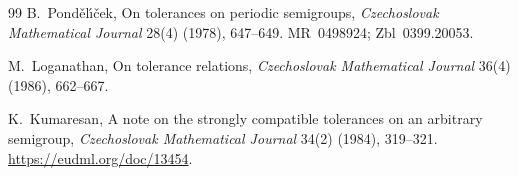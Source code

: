 \documentclass[10pt,a4paper]{article}
\theoremstyle{definition}
\theoremstyle{remark}
\begin{document}
\begin{thebibliography}{99}
B.~Pond\v{e}l\'\i\v{c}ek,
\newblock On tolerances on periodic semigroups,
\newblock \emph{Czechoslovak Mathematical Journal} 28(4) (1978), 647--649.
\newblock MR~0498924; Zbl~0399.20053.

M.~Loganathan,
\newblock On tolerance relations,
\newblock \emph{Czechoslovak Mathematical Journal} 36(4) (1986), 662--667.

K.~Kumaresan,
\newblock A note on the strongly compatible tolerances on an arbitrary semigroup,
\newblock \emph{Czechoslovak Mathematical Journal} 34(2) (1984), 319--321.
\newblock \url{https://eudml.org/doc/13454}.

\end{thebibliography}
\end{document}
